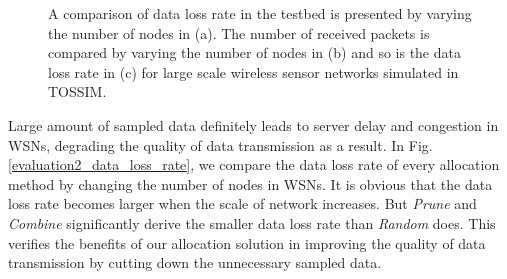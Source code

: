 \documentclass[prodmode,acmtosn]{acmsmall}
\begin{document}
\begin{figure}[!t]
\centering
{}
\hspace{7pt}
\hspace{7pt}
\caption{A comparison of data loss rate in the testbed is presented by varying the number of nodes in (a). The number of received packets is compared by varying the number of nodes in (b) and so is the data loss rate in (c) for large scale wireless sensor networks simulated in TOSSIM.}
\label{evaluation3}
\end{figure}

Large amount of  sampled data definitely leads to server delay and congestion  in WSNs, degrading the quality of data transmission as a result. In Fig. \ref{evaluation2_data_loss_rate}, we compare the data loss rate of every allocation method by changing the number of nodes in WSNs. It is obvious that the data loss rate becomes larger when the scale of network increases. But \emph{Prune} and \emph{Combine} significantly derive the smaller data loss rate than \emph{Random} does. This verifies the benefits of our allocation solution in improving the quality of data transmission by cutting down the unnecessary sampled data.
\end{document}
